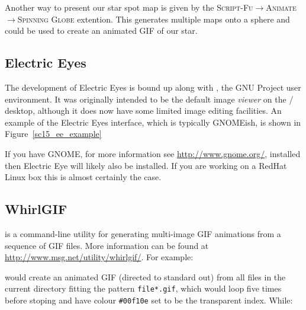 \documentclass[twoside,11pt]{starlink}
\begin{document}
Another way to present our star spot map is given by the \textsc{Script-Fu}$\rightarrow$\textsc{Animate}$\rightarrow$\textsc{Spinning Globe}
extention. This generates multiple maps onto a sphere and could be
used to create an animated GIF of our star.

\subsection{Electric Eyes\label{sc15_ee}}

The development of Electric Eyes is bound up along with
, the GNU Project user
environment. It was originally intended to be the default image \emph{viewer} on the
/
desktop, although it does now have some limited image editing
facilities. An example of the Electric Eyes interface, which is
typically GNOMEish, is shown in Figure~\ref{sc15_ee_example}


If you have GNOME, for more information see \url{http://www.gnome.org/}, installed then Electric Eye will likely also
be installed. If you are working on a RedHat Linux box this is almost
certainly the case.

\subsection{WhirlGIF\label{sc15_whirlgif}}

 is
a command-line utility for generating multi-image GIF animations from
a sequence of GIF files. More information can be found at \url{http://www.msg.net/utility/whirlgif/}. For example:

\begin{terminalv}
\end{terminalv}

would create an animated GIF (directed to standard out) from all files
in the current directory fitting the pattern \texttt{file*.gif}, which
would loop five times before stoping and have colour \texttt{\#00f10e}
set to be the transparent index. While:

\begin{terminalv}
\end{terminalv}
\end{document}
